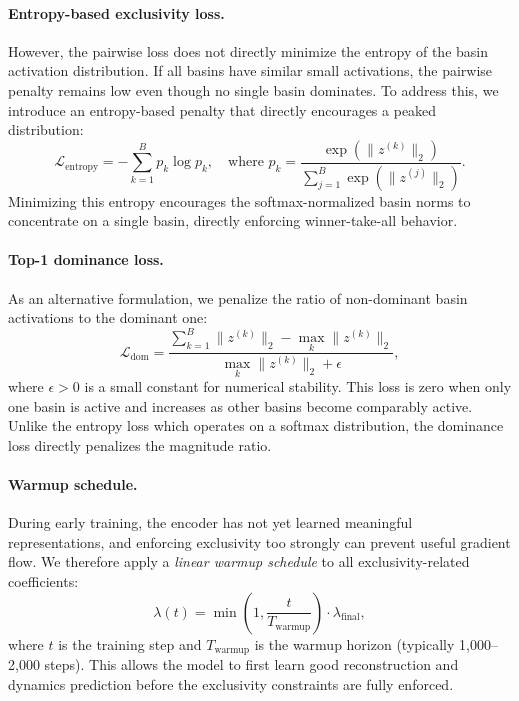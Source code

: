 \paragraph{Entropy-based exclusivity loss.}
However, the pairwise loss does not directly minimize the entropy of the basin activation distribution. If all basins have similar small activations, the pairwise penalty remains low even though no single basin dominates. To address this, we introduce an entropy-based penalty that directly encourages a peaked distribution:
\begin{equation}
\label{eq:entropy-excl}
    \mathcal{L}_{\text{entropy}} = -\sum_{k=1}^B p_k \log p_k, \quad \text{where } p_k = \frac{\exp(\|z^{(k)}\|_2)}{\sum_{j=1}^B \exp(\|z^{(j)}\|_2)}.
\end{equation}
Minimizing this entropy encourages the softmax-normalized basin norms to concentrate on a single basin, directly enforcing winner-take-all behavior.

\paragraph{Top-1 dominance loss.}
As an alternative formulation, we penalize the ratio of non-dominant basin activations to the dominant one:
\begin{equation}
\label{eq:dominance}
    \mathcal{L}_{\text{dom}} = \frac{\sum_{k=1}^B \|z^{(k)}\|_2 - \max_k \|z^{(k)}\|_2}{\max_k \|z^{(k)}\|_2 + \epsilon},
\end{equation}
where $\epsilon > 0$ is a small constant for numerical stability. This loss is zero when only one basin is active and increases as other basins become comparably active. Unlike the entropy loss which operates on a softmax distribution, the dominance loss directly penalizes the magnitude ratio.

\paragraph{Warmup schedule.}
During early training, the encoder has not yet learned meaningful representations, and enforcing exclusivity too strongly can prevent useful gradient flow. We therefore apply a \emph{linear warmup schedule} to all exclusivity-related coefficients:
\begin{equation}
    \lambda(t) = \min\!\left(1, \frac{t}{T_{\text{warmup}}}\right) \cdot \lambda_{\text{final}},
\end{equation}
where $t$ is the training step and $T_{\text{warmup}}$ is the warmup horizon (typically 1,000--2,000 steps). This allows the model to first learn good reconstruction and dynamics prediction before the exclusivity constraints are fully enforced.

